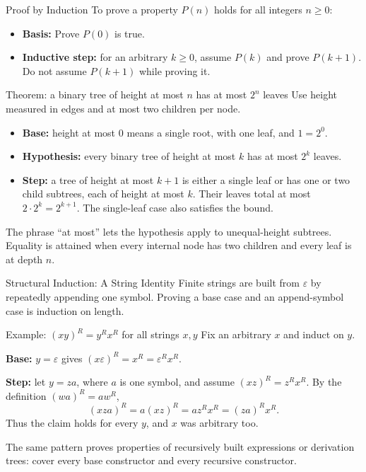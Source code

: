 \documentclass[10pt]{beamer}
\begin{document}
\begin{frame}{Proof by Induction}
  \small
  To prove a property $P(n)$ holds for all integers $n \ge 0$:
  \begin{itemize}
      \item \textbf{Basis:} Prove $P(0)$ is true.
      \item \textbf{Inductive step:} for an arbitrary $k\ge0$, assume $P(k)$
        and prove $P(k+1)$. Do not assume $P(k+1)$ while proving it.
  \end{itemize}
  \pause
  \begin{block}{Theorem: a binary tree of height at most $n$ has at most $2^n$ leaves}
    Use height measured in edges and at most two children per node.
    \begin{itemize}
        \item \textbf{Base:} height at most $0$ means a single root, with
          one leaf, and $1=2^0$.
        \item \textbf{Hypothesis:} every binary tree of height at most $k$
          has at most $2^k$ leaves.
        \pause
        \item \textbf{Step:} a tree of height at most $k+1$ is either a
          single leaf or has one or two child subtrees, each of height at
          most $k$. Their leaves total at most $2\cdot2^k=2^{k+1}$.
          The single-leaf case also satisfies the bound.
    \end{itemize}
  \end{block}
  The phrase ``at most'' lets the hypothesis apply to unequal-height
  subtrees. Equality is attained when every internal node has two children
  and every leaf is at depth $n$.
\end{frame}

\begin{frame}{Structural Induction: A String Identity}
  \small
  Finite strings are built from $\varepsilon$ by repeatedly appending one
  symbol. Proving a base case and an append-symbol case is induction on length.
  \begin{block}{Example: $(xy)^R=y^Rx^R$ for all strings $x,y$}
    Fix an arbitrary $x$ and induct on $y$.
    \par\smallskip
    \textbf{Base:} $y=\varepsilon$ gives
    $(x\varepsilon)^R=x^R=\varepsilon^Rx^R$.
    \pause
    \par\smallskip
    \textbf{Step:} let $y=za$, where $a$ is one symbol, and assume
    $(xz)^R=z^Rx^R$. By the definition $(wa)^R=aw^R$,
    \[
      (xza)^R=a(xz)^R=az^Rx^R=(za)^Rx^R.
    \]
    Thus the claim holds for every $y$, and $x$ was arbitrary too.
  \end{block}
  \pause
  The same pattern proves properties of recursively built expressions or
  derivation trees: cover every base constructor and every recursive constructor.
\end{frame}
\end{document}
